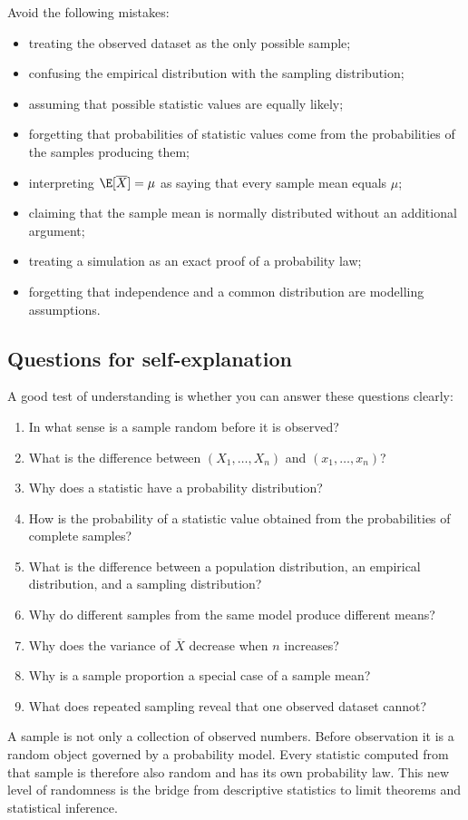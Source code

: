 Avoid the following mistakes:

\begin{itemize}
    \item treating the observed dataset as the only possible sample;
    \item confusing the empirical distribution with the sampling distribution;
    \item assuming that possible statistic values are equally likely;
    \item forgetting that probabilities of statistic values come from the
    probabilities of the samples producing them;
    \item interpreting \(\E[\overline X]=\mu\) as saying that every sample mean
    equals \(\mu\);
    \item claiming that the sample mean is normally distributed without an
    additional argument;
    \item treating a simulation as an exact proof of a probability law;
    \item forgetting that independence and a common distribution are modelling
    assumptions.
\end{itemize}

\subsection*{Questions for self-explanation}

A good test of understanding is whether you can answer these questions clearly:

\begin{enumerate}
    \item In what sense is a sample random before it is observed?
    \item What is the difference between \((X_1,\ldots,X_n)\) and
    \((x_1,\ldots,x_n)\)?
    \item Why does a statistic have a probability distribution?
    \item How is the probability of a statistic value obtained from the
    probabilities of complete samples?
    \item What is the difference between a population distribution, an empirical
    distribution, and a sampling distribution?
    \item Why do different samples from the same model produce different means?
    \item Why does the variance of \(\overline X\) decrease when \(n\) increases?
    \item Why is a sample proportion a special case of a sample mean?
    \item What does repeated sampling reveal that one observed dataset cannot?
\end{enumerate}

\begin{summarybox}
A sample is not only a collection of observed numbers. Before observation it is
a random object governed by a probability model. Every statistic computed from
that sample is therefore also random and has its own probability law. This new
level of randomness is the bridge from descriptive statistics to limit theorems
and statistical inference.
\end{summarybox}

